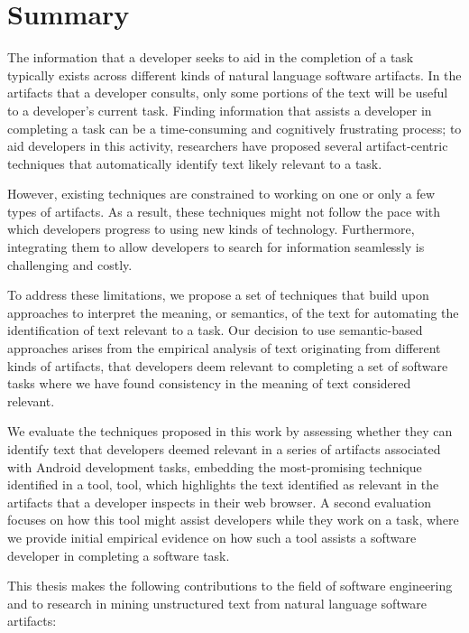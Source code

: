 \setcounter{chapter}{7}


\chapter{Summary}
\label{ch:summary}



The information that a developer seeks to aid in the completion of a task typically exists across different kinds of natural language software artifacts. In the artifacts that a developer consults, only some portions of the text will be useful to a developer's current task.
Finding information that assists a developer in completing a task can be a time-consuming and cognitively frustrating process; to aid developers in this activity, researchers have proposed several artifact-centric techniques that automatically identify text likely relevant to a task.


However, existing techniques are constrained to working on one or only a  few types of artifacts. As a result, these techniques might not follow the pace with which developers progress to using new kinds of technology. Furthermore, integrating them to allow developers to search for information seamlessly is challenging and costly.


To address these limitations, we propose 
a set of techniques that 
build upon approaches to interpret the meaning, or semantics, of the text 
for automating the identification of text relevant to a task.
Our decision to use semantic-based approaches arises from the empirical 
analysis of text originating from different kinds of artifacts, 
that developers deem relevant to completing a set of software tasks
where we have found consistency in the meaning of text considered relevant.



We evaluate the  techniques proposed in this work by assessing 
whether they can identify text that developers deemed relevant in a series of artifacts 
associated with Android development tasks, 
embedding the most-promising technique identified in a tool, \acs{tool},
which highlights the text identified as relevant in the artifacts 
that a developer inspects in their web browser. 
A second evaluation focuses on how this tool might assist developers  
while they work on a task, where we provide 
initial empirical evidence on how  
such a tool assists a software developer in completing a software task. 




This thesis makes the following contributions to the field of software engineering and to research in mining unstructured text from natural language software artifacts:



